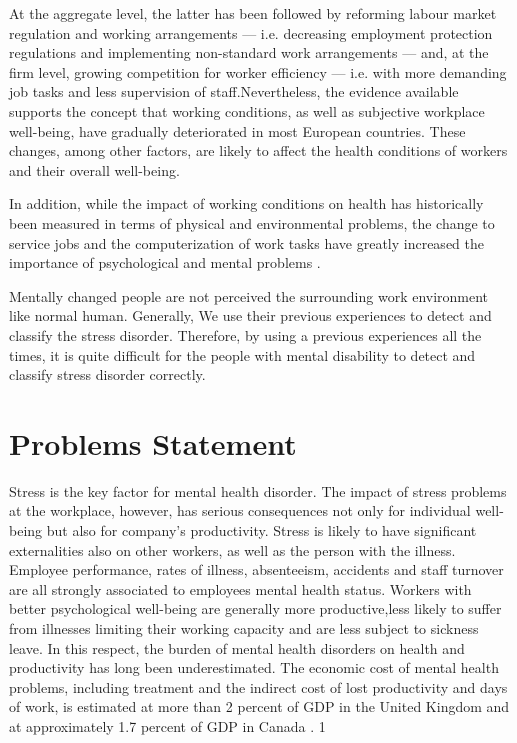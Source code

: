At the aggregate level, the latter has been followed by reforming labour market regulation and working arrangements — i.e. decreasing employment protection regulations and implementing non-standard work arrangements — and, at the firm level, growing competition for worker efficiency — i.e. with more demanding job tasks and less supervision of staff\citep{Cottini2013MentalEurope}.Nevertheless, the evidence available supports the concept that working conditions, as well as subjective workplace well-being, have gradually deteriorated in most European countries\citep{Llena-Nozal2009TheCountries}. These changes, among other factors, are likely to affect the health conditions of workers and their overall well-being.

In addition, while the impact of working conditions on health has historically been measured in terms of physical and environmental problems, the change to service jobs and the computerization of work tasks have greatly increased the importance of psychological and mental problems \citep{Cappelli1997ChangeWork}\citep{Robone2008ContractualSurvey}.

Mentally changed people are not perceived the surrounding work environment like normal human. Generally, We use their previous experiences to detect and classify the stress disorder. Therefore, by using a previous experiences all the times, it is quite difficult for the people with mental disability to detect and classify stress disorder correctly.



\section{Problems Statement }

Stress is the key factor for mental health disorder. The impact of stress problems at the workplace, however, has serious consequences not only for individual well-being but also for company's productivity. Stress is likely to have significant externalities also on other workers, as well as the person with the illness. Employee performance, rates of illness, absenteeism, accidents and staff turnover are all strongly associated to employees mental health status. Workers with better psychological well-being are generally more productive,less likely to suffer from illnesses limiting their working capacity and are less subject to sickness leave. 
In this respect, the burden of mental health disorders on health and productivity has long been underestimated. The economic cost of mental health problems, including treatment and the indirect cost of lost productivity and days of work, is estimated at more than 2 percent of GDP in the United Kingdom \citep{Cooper2005Happiness:Science} and at approximately 1.7 percent of GDP in Canada \citep{stephens}. 1

